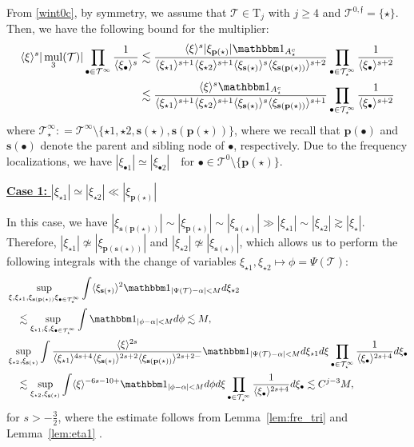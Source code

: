 \documentclass[%
11pt,  reqno]{amsart}
\newcommand{\5}{\textup{V}}
\newcommand{\noi}{\noindent}
\newcommand{\ind}{\mathbbm 1}
\newcommand{\les}{\lesssim}
\theoremstyle{remark}
\newcommand{\bul}{\bullet}
\newcommand{\TT}{\mathcal{T}}
\newcommand{\Tr}{\mathrm{T}}
\newcommand{\al}{\alpha}
\newcommand{\pb}{\mathbf{p}}
\newcommand{\sbf}{\mathbf{s}}
\newcommand{\ges}{\gtrsim}
\newcommand{\jb}[1]
{\langle #1 \rangle}
\newcommand{\ff}{\mathfrak{f}}
\DeclareMathOperator{\mul}{mul}
\numberwithin{equation}{section}
\numberwithin{theorem}{section}
\begin{document}
From \eqref{wint0c}, by symmetry, we assume that $\TT \in \Tr_j$ with $j\ge4$ and $\TT^{0,\ff} = \{\star\}$. Then,  we have the following bound for the multiplier:
\begin{align}
    \jb{\xi}^s | \mul_3 (\TT)| 
    \prod_{\bul \in \TT^\infty} \frac{1}{\jb{\xi_\bul}^s}
    &
    \les 
    \frac{\jb{\xi}^{s} |\xi_{\pb(\star)}|  \ind_{A_\star^c} }{ \jb{\xi_{\star1}}^{s+1} \jb{\xi_{\star2}}^{s+1} \jb{\xi_{\sbf(\star)}}^s \jb{\xi_{\sbf(\pb(\star))}}^{s+2}} \prod_{\bul \in \TT^\infty_\star} \frac{1}{\jb{\xi_\bul}^{s+2}}
    \\
    &
    \les 
    \frac{\jb{\xi}^{s} \ind_{A_\star^c} }{ \jb{\xi_{\star1}}^{s+1} \jb{\xi_{\star2}}^{s+1} \jb{\xi_{\sbf(\star)}}^s \jb{\xi_{\sbf(\pb(\star))}}^{s+1}} \prod_{\bul \in \TT^\infty_\star} \frac{1}{\jb{\xi_\bul}^{s+2}}
\end{align}
where $\TT^\infty_\star : = \TT^\infty \setminus \{\star1, \star2, \sbf(\star), \sbf(\pb(\star))\}$, where we recall that $\pb(\bul)$ and $\sbf(\bul)$ denote the parent and sibling node of $\bul$, respectively.
Due to the frequency localizations, we have
$
    |\xi_{\bul1}| \simeq |\xi_{\bul2}| \quad \text{for } \bul \in \TT^0\setminus\{\pb(\star)\} 
$.



\smallskip
\noi
\underline{\textbf{Case 1:} $|\xi_{\star1}| \simeq |\xi_{\star2}| \ll |\xi_{\pb(\star)}|$}

In this case, we have $|\xi_{\sbf(\pb(\star))}| \sim |\xi_{\pb(\star)}| \sim |\xi_{\sbf(\star)}| \gg |\xi_{\star1}| \sim |\xi_{\star2}| \ges |\xi_\star|$.
Therefore, $|\xi_{\star1}| \not \simeq |\xi_{\pb(\sbf(\star))}| $ and $|\xi_{\star2}| \not \simeq |\xi_{\sbf(\star)}|$, which allows us to perform the following integrals with the change of variables $\xi_{\star1}, \xi_{\star2} \mapsto \phi = \Psi(\TT)$:
\begin{align}\label{L23a}
    & \sup_{ \xi,\xi_{\star1}, \xi_{\sbf(\pb(\star))} \xi_{\bul\in \TT^\infty_\star}} 
    \int 
    \jb{\xi_{\sbf(\star)}}^2 
    \ind_{|\Psi(\TT)-\al|< M } 
    d\xi_{\star2} 
    \\
    &
    \quad 
    \les 
    \sup_{\xi_{\star1}, \xi, \xi_{\bul\in \TT^\infty_\star}} 
    \int 
    \ind_{|\phi-\al|  < M} d\phi 
    \les M
    , 
    \\
    &
    \sup_{\xi_{\star2}, \xi_{\sbf(\star)}} 
    \int 
    \frac{\jb{\xi}^{2s}   }{ \jb{\xi_{\star1}}^{4s+4} \jb{\xi_{\sbf(\star)}}^{2s+2} \jb{\xi_{\sbf(\pb(\star))}}^{2s+2-} }
    \ind_{|\Psi(\TT)-\al|< M } 
    d\xi_{\star1} d\xi 
    \prod_{\bul\in\TT^\infty_\star} \frac{1}{\jb{\xi_\bul}^{2s+4}} d\xi_\bul
    \\
    &
    \quad 
    \les 
    \sup_{\xi_{\star2}, \xi_{\sbf(\star)}} 
    \int \jb{\xi}^{-6s-10+} \ind_{|\phi-\al|< M} d\phi d\xi \prod_{\bul\in\TT^\infty_\star} \frac{1}{\jb{\xi_\bul}^{2s+4}} d\xi_\bul
    \les C^{j-3 } M 
    ,
\end{align}
for $s>-\frac32$, where the estimate follows from Lemma~\ref{lem:fre_tri} and Lemma~\ref{lem:eta1}
.
\end{document}
